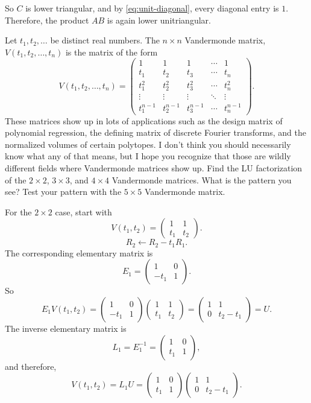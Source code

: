 \documentclass[10pt]{extarticle}
\begin{document}
So $C$ is lower triangular, and by \eqref{eq:unit-diagonal}, every diagonal entry is $1$. Therefore, the product $AB$ is again lower unitriangular.

\newpage

\begin{problem}[Problem 2]
Let $t_1,t_2,\dots$ be distinct real numbers. The $n\times n$ Vandermonde matrix, $V(t_1,t_2,\dots,t_n)$ is the matrix of the form
\[
V(t_1,t_2,\dots,t_n)=
\begin{pmatrix}
1 & 1 & 1 & \cdots & 1\\
t_1 & t_2 & t_3 & \cdots & t_n\\
t_1^2 & t_2^2 & t_3^2 & \cdots & t_n^2\\
\vdots & \vdots & \vdots & \ddots & \vdots\\
t_1^{n-1} & t_2^{n-1} & t_3^{n-1} & \cdots & t_n^{n-1}
\end{pmatrix}.
\]
These matrices show up in lots of applications such as the design matrix of polynomial regression, the defining matrix of discrete Fourier transforms, and the normalized volumes of certain polytopes. I don't think you should necessarily know what any of that means, but I hope you recognize that those are wildly different fields where Vandermonde matrices show up. Find the LU factorization of the $2\times 2$, $3\times 3$, and $4\times 4$ Vandermonde matrices. What is the pattern you see? Test your pattern with the $5\times 5$ Vandermonde matrix.
\end{problem}

For the $2\times 2$ case, start with
\[
V(t_1,t_2)=
\begin{pmatrix}
1 & 1\\
t_1 & t_2
\end{pmatrix}.
\]
\[
R_2\leftarrow R_2-t_1R_1.
\]
The corresponding elementary matrix is
\[
E_1=
\begin{pmatrix}
1 & 0\\
-t_1 & 1
\end{pmatrix}.
\]
So
\[
E_1V(t_1,t_2)=
\begin{pmatrix}
1 & 0\\
-t_1 & 1
\end{pmatrix}
\begin{pmatrix}
1 & 1\\
t_1 & t_2
\end{pmatrix}
=
\begin{pmatrix}
1 & 1\\
0 & t_2-t_1
\end{pmatrix}
=U.
\]
The inverse elementary matrix is
\[
L_1=E_1^{-1}=
\begin{pmatrix}
1 & 0\\
t_1 & 1
\end{pmatrix},
\]
and therefore,
\[
V(t_1,t_2)=L_1U=
\begin{pmatrix}
1 & 0\\
t_1 & 1
\end{pmatrix}
\begin{pmatrix}
1 & 1\\
0 & t_2-t_1
\end{pmatrix}.
\]
\end{document}
